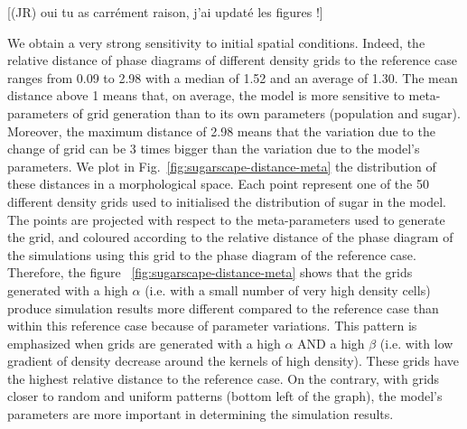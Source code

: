 \documentclass[Royal,sageh,times]{sagej}
\begin{document}
[(JR) oui tu as carrément raison, j'ai updaté les figures !]


We obtain a very strong sensitivity to initial spatial conditions. Indeed, the relative distance of phase diagrams of different density grids to the reference case ranges from 0.09 to 2.98 with a median of 1.52 and an average of 1.30. The mean distance above 1 means that, on average, the model is more sensitive to meta-parameters of grid generation than to its own parameters (population and sugar). Moreover, the maximum distance of 2.98 means that the variation due to the change of grid can be 3 times bigger than the variation due to the model's parameters. We plot in Fig.~\ref{fig:sugarscape-distance-meta} the distribution of these distances in a morphological space. Each point represent one of the 50 different density grids used to initialised the distribution of sugar in the model. The points are projected with respect to the meta-parameters used to generate the grid, and coloured according to the relative distance of the phase diagram of the simulations using this grid to the phase diagram of the reference case. Therefore, the figure ~\ref{fig:sugarscape-distance-meta} shows that the grids generated with a high $\alpha$ (i.e. with a small number of very high density cells) produce simulation results more different compared to the reference case than within this reference case because of parameter variations. This pattern is emphasized when grids are generated with a high $\alpha$ AND a high $\beta$ (i.e. with low gradient of density decrease around the kernels of high density). These grids have the highest relative distance to the reference case. On the contrary, with grids closer to random and uniform patterns (bottom left of the graph), the model's parameters are more important in determining the simulation results. 
\end{document}
